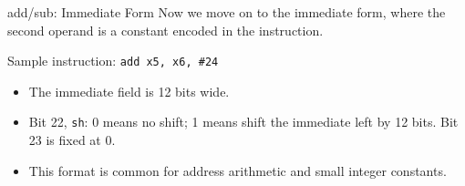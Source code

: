 \documentclass[aspectratio=169,11pt,t]{beamer}
\newcommand{\code}[1]{\texttt{#1}}
\newcommand{\bfld}[5]{%
  \pgfmathsetmacro{\cx}{#1 + #3/2}%
  \fill[#5] (#1,#2) rectangle ++(#3,0.72);%
  \draw[navy,line width=0.7pt] (#1,#2) rectangle ++(#3,0.72);%
  \node[font=\scriptsize\ttfamily,text height=1.5ex,text depth=0.35ex,align=center,text=darkgray] at (\cx,#2+0.36) {#4};%
}
\newcommand{\bitnote}[3]{%
  \node[font=\tiny,text height=1.5ex,text depth=0.35ex,align=center,text=darkgray] at (#1,#2) {#3};%
}
\begin{document}
\begin{frame}{add/sub: Immediate Form}
Now we move on to the immediate form, where the second operand is a constant encoded in the instruction.

\begin{center}
Sample instruction: \code{add x5, x6, \#24}
\end{center}

\vspace{0.1cm}

\begin{center}
\end{center}

\vspace{0.15cm}

\begin{itemize}\setlength{\itemsep}{5pt}
  \item The immediate field is 12 bits wide.
  \item Bit 22, \code{sh}: 0 means no shift; 1 means shift the immediate left by 12 bits. Bit 23 is fixed at 0.
  \item This format is common for address arithmetic and small integer constants.
\end{itemize}

\end{frame}

\end{document}

